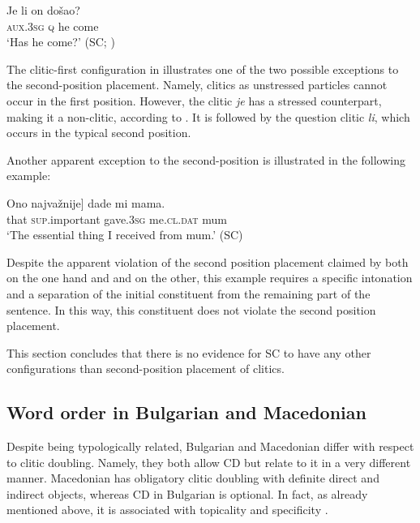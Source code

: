 \documentclass[output=paper,
colorlinks,
citecolor=brown,
newtxmath
]{langscibook}
\begin{document}

\ea\label{ex:22}
\gll Je li on došao?\\
     \textsc{aux.3sg} \textsc{q} he come\\
\glt `Has he come?'
\hfill (SC; \citealt[46]{Radanovic-Kocic1988})
\z



\noindent The clitic-first configuration in  illustrates one of the two possible exceptions to the second-position placement. Namely, clitics as unstressed particles cannot occur in the first position. However, the clitic \textit{je} has a stressed counterpart, making it a non-clitic, according to \citet[226]{Franks.King2000}. It is followed by the question clitic \textit{li}, which occurs in the typical second position.

Another apparent exception to the second-position is illustrated in the following example:


\ea\label{ex:23}
\gll\minsp{[} Ono najvažnije]    dade     mi        mama.       \\
    {} that \textsc{sup}.important gave.\textsc{3sg} me.\textsc{cl.dat} mum \\
\glt `The essential thing I received from mum.'
\hfill (SC)
\z

\noindent Despite the apparent violation of the second position placement claimed by both \citet{Franks.King2000} on the one hand and \citet{Boskovic2001} and \citet{Radanovic-Kocic1988} on the other, this example requires a specific intonation and a separation of the initial constituent from the remaining part of the sentence. In this way, this constituent does not violate the second position placement.

This section concludes that there is no evidence for SC to have any other configurations than second-position placement of clitics.

\subsection{Word order in Bulgarian and Macedonian}
\label{subsec:orderBM}
Despite being typologically related, Bulgarian and Macedonian differ with respect to clitic doubling. Namely, they both allow CD but relate to it in a very different manner. Macedonian has obligatory clitic doubling with definite direct and indirect objects, whereas CD in Bulgarian is optional. In fact, as already mentioned above, it is associated with topicality and specificity \citep{Sportiche1996,Cinque.Krapova2008}.
\end{document}
